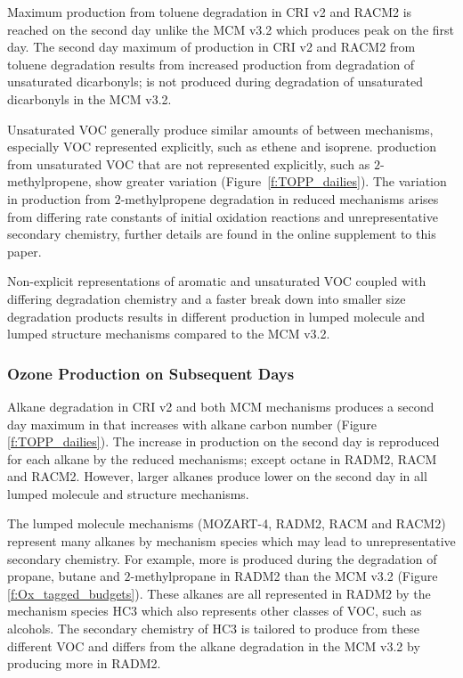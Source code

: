 Maximum  production from toluene degradation in CRI v2 and RACM2 is reached on the second day unlike the MCM v3.2 which produces peak  on the first day.
The second day maximum of  production in CRI v2 and RACM2 from toluene degradation results from increased  production from degradation of unsaturated dicarbonyls;  is not produced during degradation of unsaturated dicarbonyls in the MCM v3.2.

Unsaturated VOC generally produce similar amounts of  between mechanisms, especially VOC represented explicitly, such as ethene and isoprene.
 production from unsaturated VOC that are not represented explicitly, such as $2$-methylpropene, show greater variation \mbox{(Figure \ref{f:TOPP_dailies}).}
The variation in  production from $2$-methylpropene degradation in reduced mechanisms arises from differing rate constants of initial oxidation reactions and unrepresentative secondary chemistry, further details are found in the online supplement to this paper.

Non-explicit representations of aromatic and unsaturated VOC coupled with differing degradation chemistry and a faster break down into smaller size degradation products results in different  production in lumped molecule and lumped structure mechanisms compared to the MCM v3.2.
%
\subsubsection{Ozone Production on Subsequent Days} \label{sss:profiles} %
%
Alkane degradation in CRI v2 and both MCM mechanisms produces a second day maximum in  that increases with alkane carbon number (Figure \ref{f:TOPP_dailies}).
The increase in  production on the second day is reproduced for each alkane by the reduced mechanisms; except octane in RADM2, RACM and RACM2.
However, larger alkanes produce lower  on the second day in all lumped molecule and structure mechanisms.

The lumped molecule mechanisms (MOZART-4, RADM2, RACM and RACM2) represent many alkanes by mechanism species which may lead to unrepresentative secondary chemistry.
For example, more  is produced during the degradation of propane, butane and $2$-methylpropane in RADM2 than the MCM v3.2 (Figure \ref{f:Ox_tagged_budgets}).
These alkanes are all represented in RADM2 by the mechanism species HC3 which also represents other classes of VOC, such as alcohols.
The secondary chemistry of HC3 is tailored to produce  from these different VOC and differs from the alkane degradation in the MCM v3.2 by producing more  in RADM2.

